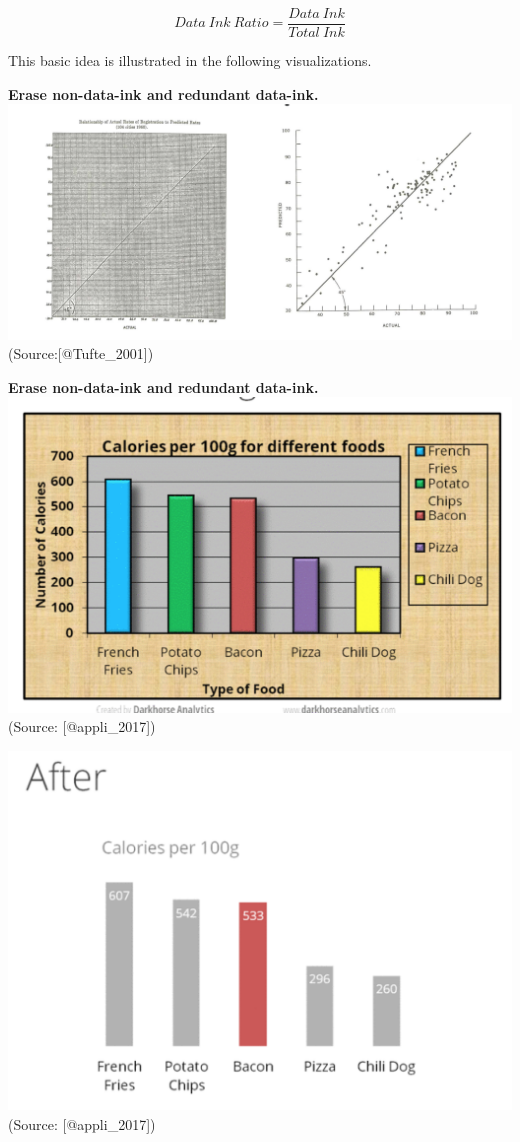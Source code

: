 \documentclass[]{book}
\theoremstyle{definition}
\theoremstyle{definition}
\theoremstyle{definition}
\theoremstyle{remark}
\begin{document}
\[{Data \ Ink \ Ratio} = \frac{{Data \ Ink}}{{Total \ Ink}}\]

This basic idea is illustrated in the following visualizations.

\textbf{Erase non-data-ink and redundant data-ink.}
\includegraphics{images/Tufte_figure1.png} (Source:{[}@Tufte\_2001{]})

\textbf{Erase non-data-ink and redundant data-ink.}
\includegraphics{images/Tufte_figure2.png} (Source: {[}@appli\_2017{]})

\includegraphics{images/Tufte_figure3.png} (Source: {[}@appli\_2017{]})
\end{document}

